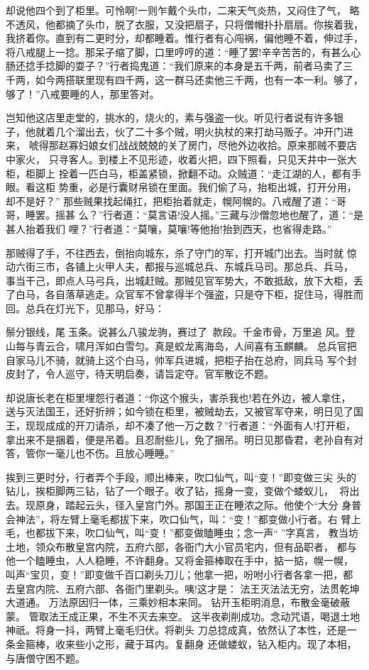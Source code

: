 却说他四个到了柜里。可怜啊!一则乍戴个头巾，二来天气炎热，又闷住了气，
略不透风，他都摘了头巾，脱了衣服，又没把扇子，只将僧帽扑扑扇扇。你挨着我，
我挤着你。直到有二更时分，却都睡着。惟行者有心闯祸，偏他睡不着，伸过手，
将八戒腿上一捻。那呆子缩了脚，口里哼哼的道：“睡了罢!辛辛苦苦的，有甚么心
肠还捻手捻脚的耍子？”行者捣鬼道：“我们原来的本身是五千两，前者马卖了三
千两，如今两搭联里现有四千两，这一群马还卖他三千两，也有一本一利。够了，
够了！”八戒要睡的人，那里答对。

岂知他这店里走堂的，挑水的，烧火的，素与强盗一伙。听见行者说有许多银
子，他就着几个溜出去，伙了二十多个贼，明火执杖的来打劫马贩子。冲开门进来，
唬得那赵寡妇娘女们战战兢兢的关了房门，尽他外边收拾。原来那贼不要店中家火，
只寻客人。到楼上不见形迹，收着火把，四下照看，只见天井中一张大柜，柜脚上
拴着一匹白马，柜盖紧锁，掀翻不动。众贼道：“走江湖的人，都有手眼。看这柜
势重，必是行囊财帛锁在里面。我们偷了马，抬柜出城，打开分用，却不是好？”
那些贼果找起绳扛，把柜抬着就走，幌阿幌的。八戒醒了道：“哥哥，睡罢。摇甚
么？”行者道：“莫言语!没人摇。”三藏与沙僧忽地也醒了，道：“是甚人抬着我们
哩？”行者道：“莫嚷，莫嚷!等他抬!抬到西天，也省得走路。”

那贼得了手，不往西去，倒抬向城东，杀了守门的军，打开城门出去。当时就
惊动六街三市，各铺上火甲人夫，都报与巡城总兵、东城兵马司。那总兵、兵马，
事当干己，即点人马弓兵，出城赶贼。那贼见官军势大，不敢抵敌，放下大柜，丢
了白马，各自落草逃走。众官军不曾拿得半个强盗，只是夺下柜，捉住马，得胜而
回。总兵在灯光下，见那马，好马：

鬃分银线，尾玉条。说甚么八骏龙驹，赛过了款段。千金市骨，万里追
风。登山每与青云合，啸月浑如白雪匀。真是蛟龙离海岛，人间喜有玉麒麟。
总兵官把自家马儿不骑，就骑上这个白马，帅军兵进城，把柜子抬在总府，同兵马
写个封皮封了，令人巡守，待天明启奏，请旨定夺。官军散讫不题。

却说唐长老在柜里埋怨行者道：“你这个猴头，害杀我也!若在外边，被人拿住，
送与灭法国王，还好折辨；如今锁在柜里，被贼劫去，又被官军夺来，明日见了国
王，现现成成的开刀请杀，却不凑了他一万之数？”行者道：“外面有人!打开柜，
拿出来不是捆着，便是吊着。且忍耐些儿，免了捆吊。明日见那昏君，老孙自有对
答，管你一毫儿也不伤。且放心睡睡。”

挨到三更时分，行者弄个手段，顺出棒来，吹口仙气，叫“变！”即变做三尖
头的钻儿，挨柜脚两三钻，钻了一个眼子。收了钻，摇身一变，变做个蝼蚁儿，
将出去。现原身，踏起云头，径入皇宫门外。那国王正在睡浓之际。他使个“大分
身普会神法”，将左臂上毫毛都拔下来，吹口仙气，叫：“变！”都变做小行者。右
臂上毛，也都拔下来，吹口仙气，叫“变！”都变做瞌睡虫；念一声“”字真言，
教当坊土地，领众布散皇宫内院，五府六部，各衙门大小官员宅内，但有品职者，
都与他一个瞌睡虫，人人稳睡，不许翻身。又将金箍棒取在手中，掂一掂，幌一幌，
叫声“宝贝，变！”即变做千百口剃头刀儿；他拿一把，吩咐小行者各拿一把，都
去皇宫内院、五府六部、各衙门里剃头。咦!这才是：
法王灭法法无穷，法贯乾坤大道通。
万法原因归一体，三乘妙相本来同。
钻开玉柜明消息，布散金毫破蔽蒙。
管取法王成正果，不生不灭去来空。
这半夜剃削成功。念动咒语，喝退土地神祇。将身一抖，两臂上毫毛归伏。将剃头
刀总捻成真，依然认了本性，还是一条金箍棒，收来些小之形，藏于耳内。复翻身
还做蝼蚁，钻入柜内。现了本相，与唐僧守困不题。


